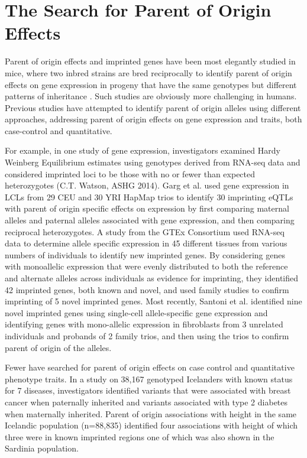\section{The Search for Parent of Origin Effects}


Parent of origin effects and imprinted genes have been most elegantly studied in mice, where two inbred strains are bred reciprocally to identify parent of origin effects on gene expression in progeny that have the same genotypes but different patterns of inheritance\cite{Babak2012} . Such studies are obviously more challenging in humans. Previous studies have attempted to identify parent of origin alleles using different approaches, addressing parent of origin effects on gene expression and traits, both case-control and quantitative.

For example, in one study of gene expression, investigators examined Hardy Weinberg Equilibrium estimates using genotypes derived from RNA-seq data and considered imprinted loci to be those with no or fewer than expected heterozygotes (C.T. Watson, ASHG 2014). Garg et al. used gene expression in LCLs from 29 CEU and 30 YRI HapMap trios to identify 30 imprinting eQTLs with parent of origin specific effects on expression by first comparing maternal alleles and paternal alleles associated with gene expression, and then comparing reciprocal heterozygotes\cite{Garg2012a}. A study from the GTEx Consortium used RNA-seq data to determine allele specific expression in 45 different tissues from various numbers of individuals to identify new imprinted genes\cite{Baran:2015cx}. By considering genes with monoallelic expression that were evenly distributed to both the reference and alternate alleles across individuals as evidence for imprinting, they identified 42 imprinted genes, both known and novel, and used family studies to confirm imprinting of 5 novel imprinted genes. Most recently, Santoni et al. identified nine novel imprinted genes using single-cell allele-specific gene expression and identifying genes with mono-allelic expression in fibroblasts from 3 unrelated individuals and probands of 2 family trios, and then using the trios to confirm parent of origin of the alleles\cite{Santoni:2017hu}.

Fewer have searched for parent of origin effects on case control and quantitative phenotype traits. In a study on 38,167 genotyped Icelanders with known status for 7 diseases, investigators identified variants that were associated with breast cancer when paternally inherited and variants associated with type 2 diabetes when maternally inherited\cite{Kong:2009kk}. Parent of origin associations with height in the same Icelandic population (n=88,835) identified four associations with height of which three were in known imprinted regions one of which was also shown in the Sardinia population\cite{Zoledziewska:2015do}.


